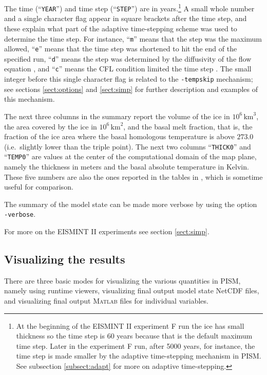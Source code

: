 \documentclass[11pt,final]{amsart}
\renewcommand{\t}[1]{\texttt{#1}}
\newcommand{\Matlab}{\textsc{Matlab}\xspace}
\begin{document}
The time (``\t{YEAR}'') and time step (``\t{STEP}'') are in years.\footnote{At the beginning of the EISMINT II experiment F run the ice has small thickness so the time step is 60 years because that is the default maximum time step.  Later in the experiment F run, after 5000 years, for instance, the time step is made smaller by the adaptive time-stepping mechanism in PISM.  See subsection \ref{subsect:adapt} for more on adaptive time-stepping.}  A small whole number and a single character flag appear in square brackets after the time step, and these explain what part of the adaptive time-stepping scheme was used to determine the time step.  For instance, ``\t{m}'' means that the step was the maximum allowed, ``\t{e}'' means that the time step was shortened to hit the end of the specified run, ``\t{d}'' means the step was determined by the diffusivity of the flow equation \cite{BBL}, and ``\t{c}'' means the CFL condition limited the time step \cite{BBL,MortonMayers}.  The small integer before this single character flag is related to the \verb|-tempskip| mechanism; see sections \ref{sect:options} and \ref{sect:simp} for further description and examples of this mechanism.

The next three columns in the summary report the volume of the ice in $10^6 \,\text{km}^3$, the area covered by the ice in $10^6\,\text{km}^2$, and the basal melt fraction, that is, the fraction of the ice area where the basal homologous temperature is above $273.0$ (i.e.~slightly lower than the triple point).  The next two columns ``\texttt{THICK0}'' and ``\texttt{TEMP0}'' are values at the center of the computational domain of the map plane, namely the thickness in meters and the basal absolute temperature in Kelvin.  These five numbers are also the ones reported in the tables in \cite{EISMINT00}, which is sometime useful for comparison.

The summary of the model state can be made more verbose by using the option \verb|-verbose|.

For more on the EISMINT II experiments see section \ref{sect:simp}.

\subsection{Visualizing the results}  There are three basic modes for visualizing the various quantities in PISM, namely using runtime viewers, visualizing final output model state NetCDF files, and visualizing final output \Matlab files for individual variables.
\end{document}
